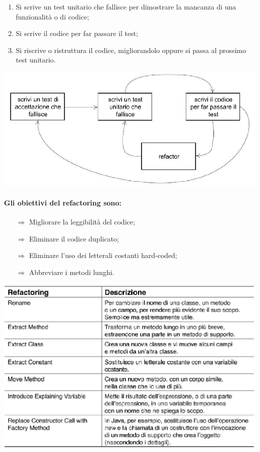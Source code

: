 \begin{enumerate}
    \item Si scrive un test unitario che fallisce per dimostrare
    la mancanza di una funzionalità o di codice;
    \item Si scrive il codice per far passare il test;
    \item Si riscrive o ristruttura il codice, migliorandolo oppure si
    passa al prossimo test unitario.
\end{enumerate}

\begin{center}
    \includegraphics[scale=0.35]{images/Test.png}
\end{center}

\paragraph{Gli obiettivi del refactoring sono:}

\begin{itemize}
    \item [$\Rightarrow$] Migliorare la leggibilità del codice;
    \item [$\Rightarrow$] Eliminare il codice duplicato;
    \item [$\Rightarrow$] Eliminare l'uso dei letterali costanti hard-coded;
    \item [$\Rightarrow$] Abbreviare i metodi lunghi.
\end{itemize}

\begin{center}
    \includegraphics[scale=0.4]{images/Refactoring.png}
\end{center}
